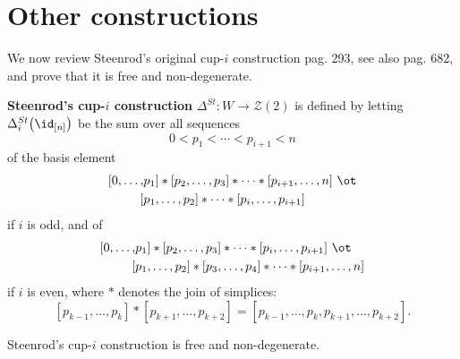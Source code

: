 
\section{Other constructions} \label{s:others}

\iffalse
We now review Steenrod's original cup-$i$ construction \cite{steenrod1947products} pag. 293, see also \cite{mcclure2003multivariable} pag. 682, and prove that it is free and non-degenerate.

\begin{definition}
	\textbf{Steenrod's cup-$i$ construction} $\Delta^{St} \colon W \to \mathcal{Z}(2)$ is defined by letting $\Delta_i^{St} \big( \id_{[n]} \big)$ be the sum over all sequences
	\[
	0 < p_1 < \cdots < p_{i+1} < n
	\]
	of the basis element
	\begin{equation} \label{equation: steenrod original i odd}
	\begin{split}
	[ 0, \dots, &{p_1} ] \ast [ {p_2}, \dots, {p_3} ] \ast \cdots \ast [ {p_{i+1}}, \dots, n ]\ \ot \\
	[ &{p_1}, \dots, {p_2} ] \ast \cdots \ast [ {p_{i}}, \dots, {p_{i+1}} ]
	\end{split}
	\end{equation}
	if $i$ is odd, and of
	\begin{equation} \label{equation: steenrod original i even}
	\begin{split}
	[ 0, \dots, &{p_1} ] \ast [ {p_2}, \dots, {p_3} ] \ast \cdots \ast [ {p_{i}}, \dots, {p_{i+1}} ]\ \ot \\
	[ &{p_1}, \dots, {p_2} ] \ast [ {p_3}, \dots, {p_4} ] \ast \cdots \ast [ {p_{i+1}}, \dots, n ]
	\end{split}
	\end{equation}
	if $i$ is even, where $\ast$ denotes the join of simplices:
	\[
	[{p_{k-1}}, \dots, {p_{k}} ] \ast [ {p_{k+1}}, \dots, p_{k+2}] = [{p_{k-1}}, \dots, p_k, p_{k+1}, \dots, p_{k+2}].
	\]
\end{definition}

\begin{proposition}
	Steenrod's cup-$i$ construction is free and non-degenerate.
\end{proposition}

